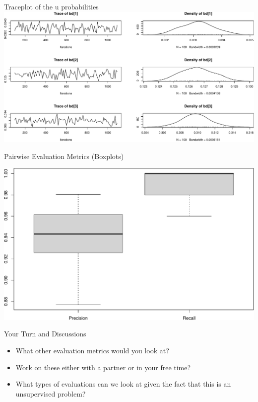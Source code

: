 \documentclass[
  ignorenonframetext,
]{beamer}
\begin{document}
\begin{frame}{Traceplot of the u probabilities}
\includegraphics{bayesian-fellegi-sunter-vignette_files/figure-beamer/unnamed-chunk-11-4.pdf}

\end{frame}

\begin{frame}{Pairwise Evaluation Metrics (Boxplots)}
\protect\hypertarget{pairwise-evaluation-metrics-boxplots}{}

\includegraphics{bayesian-fellegi-sunter-vignette_files/figure-beamer/unnamed-chunk-12-1.pdf}

\end{frame}

\begin{frame}{Your Turn and Discussions}
\protect\hypertarget{your-turn-and-discussions}{}

\begin{itemize}
\item
  What other evaluation metrics would you look at?
\item
  Work on these either with a partner or in your free time?
\item
  What types of evaluations can we look at given the fact that this is
  an unsupervised problem?
\end{itemize}

\end{frame}
\end{document}
